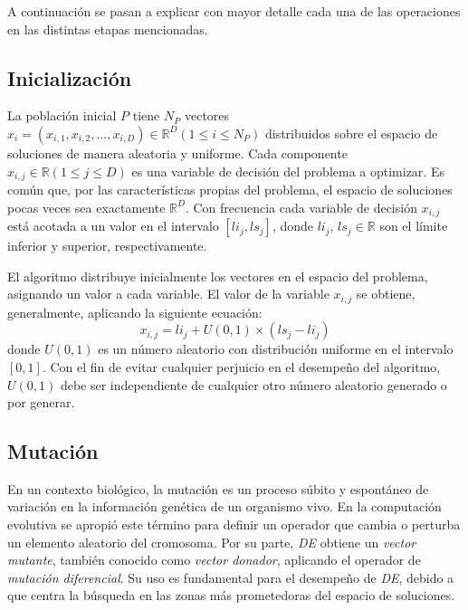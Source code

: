 A continuación se pasan a explicar con mayor detalle cada una de las operaciones en las distintas etapas mencionadas.


\subsection{Inicialización}


La población inicial $P$ tiene $N_P$ vectores $x_{i} = (x_{i,1}, x_{i,2}, . . . , x_{i,D}) \in \mathbb{R}^{D}  (1 \leq i \leq N_P)$ distribuidos sobre el espacio de soluciones de manera aleatoria y uniforme. Cada componente $x_{i,j} \in \mathbb{R} (1 \leq j \leq D)$ es una variable de decisión del problema a optimizar. Es común que, por las características propias del problema, el espacio de soluciones pocas veces sea exactamente $\mathbb{R}^{D}$. Con frecuencia cada variable de decisión $x_{i,j}$ está acotada a un valor en el intervalo $[li_j, ls_j]$, donde $li_j$, $ls_j \in \mathbb{R}$ son el límite inferior y superior,  respectivamente.


El algoritmo distribuye inicialmente los vectores en el espacio del problema, asignando un valor a cada variable. El valor de la variable $x_{i,j}$ se obtiene, generalmente, aplicando la siguiente ecuación:
\begin{equation}
x_{i,j} = li_{j} + U(0, 1) \times (ls_j - li_j)
\end{equation}
donde $U(0, 1)$ es un número aleatorio con distribución uniforme en el intervalo $[0, 1]$. Con el fin de evitar cualquier perjuicio en el desempeño del algoritmo, $U(0, 1)$ debe ser independiente de cualquier otro número aleatorio generado o por generar.


\subsection{Mutación}


En un contexto biológico, la mutación es un proceso súbito y espontáneo de variación en la información genética de un organismo vivo. En la computación evolutiva se apropió este término para definir un operador que cambia o perturba un elemento aleatorio del cromosoma. Por su parte, \textit{DE} obtiene un \textit{vector mutante}, también conocido como \textit{vector donador}, aplicando el operador de \textit{mutación diferencial}. Su uso es fundamental para el desempeño de \textit{DE}, debido a que centra la búsqueda en las zonas más prometedoras del espacio de soluciones.


